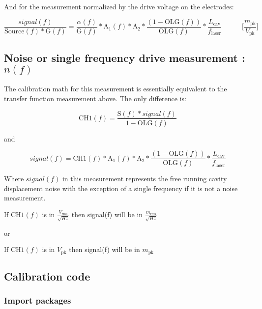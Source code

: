 \documentclass[11pt]{article}
\begin{document}
And for the measurement normalized by the drive voltage on the
electrodes:

\[\frac{signal(f)}{\mathrm{Source}(f) * \mathrm{G}(f)} = \frac{\alpha(f)}{\mathrm{G}(f)} * \mathrm{A}_{1}(f) * \mathrm{A}_2* \frac{(1-\mathrm{OLG}(f))}{\mathrm{OLG}(f)} * \frac{L_\mathrm{cav}}{f_\mathrm{laser}}\hspace{35pt} \bigg[\frac{m_\mathrm{pk}}{V_\mathrm{pk}}\bigg]\]

    \hypertarget{noise-or-single-frequency-drive-measurement-nf}{%
\subsection{\texorpdfstring{Noise or single frequency drive measurement
:
\(n(f)\)}{Noise or single frequency drive measurement : n(f)}}\label{noise-or-single-frequency-drive-measurement-nf}}

    

    The calibration math for this measurement is essentially equivalent to
the transfer function measurement above. The only difference is:

\[\mathrm{CH1}(f) = \frac{\mathrm{S}(f)* signal(f)}{1-\mathrm{OLG}(f)}\]

and

\[signal(f) = \mathrm{CH1}(f) * \mathrm{A}_{1}(f) * \mathrm{A}_2* \frac{(1-\mathrm{OLG}(f))}{\mathrm{OLG}(f)} * \frac{L_\mathrm{cav}}{f_\mathrm{laser}}\]

Where \(signal(f)\) in this measurement represents the free running
cavity displacement noise with the exception of a single frequency if it
is not a noise measurement.

If \(\mathrm{CH1}(f)\) is in \(\frac{V_\mathrm{rms}}{\sqrt{Hz}}\) then
signal(f) will be in \(\frac{m_\mathrm{rms}}{\sqrt{Hz}}\)

or

If \(\mathrm{CH1}(f)\) is in \(V_\mathrm{pk}\) then signal(f) will be in
\(m_\mathrm{pk}\)

    \hypertarget{calibration-code}{%
\subsection{Calibration code}\label{calibration-code}}

\hypertarget{import-packages}{%
\subsubsection{Import packages}\label{import-packages}}
\end{document}
